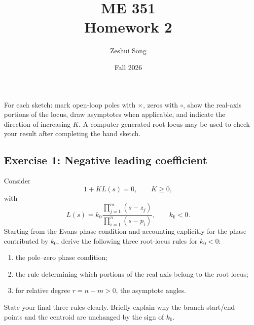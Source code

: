 \documentclass[11pt]{article}
\title{\textbf{ME 351}\\[0.5ex]\Large Homework 2}
\author{Zeshui Song}
\date{Fall 2026}
\begin{document}
\maketitle
\vspace{-1em}

For each sketch: mark open-loop poles with $\times$, zeros with $\circ$, show the real-axis portions of the locus, draw asymptotes when applicable, and indicate the direction of increasing $K$. A computer-generated root locus may be used to check your result after completing the hand sketch.

\subsection*{Exercise 1: Negative leading coefficient}
Consider
\[
1+KL(s)=0, \qquad K\geq 0,
\]
with
\[
L(s)=k_0\frac{\displaystyle\prod_{j=1}^{m}(s-z_j)}{\displaystyle\prod_{i=1}^{n}(s-p_i)}, \qquad k_0<0.
\]
Starting from the Evans phase condition and accounting explicitly for the phase contributed by $k_0$, derive the following three root-locus rules for $k_0<0$:
\begin{enumerate}
    \item[(a)] the pole--zero phase condition;
    \item[(b)] the rule determining which portions of the real axis belong to the root locus;
    \item[(c)] for relative degree $r=n-m>0$, the asymptote angles.
\end{enumerate}
State your final three rules clearly. Briefly explain why the branch start/end points and the centroid are unchanged by the sign of $k_0$.
\end{document}
